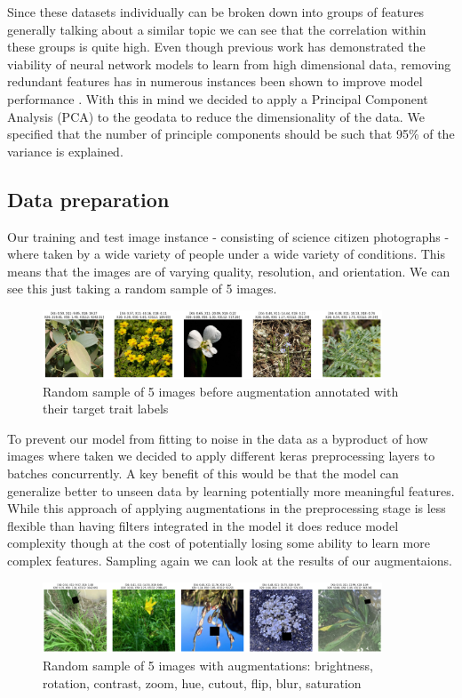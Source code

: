\documentclass[12pt,a4paper,oneside]{article}
\begin{document}
Since these datasets individually can be broken down into groups of features generally talking about a similar topic we can see that the correlation within these groups is quite high. Even though previous work \cite{DBLP:journals/corr/abs-2007-00062} has demonstrated the viability of neural network models to learn from high dimensional data, removing redundant features has in numerous instances been shown to improve model performance \cite{chen2022survey}. With this in mind we decided to apply a Principal Component Analysis (PCA) to the geodata to reduce the dimensionality of the data. We specified that the number of principle components should be such that 95\% of the variance is explained.   

\subsection{Data preparation}

Our training and test image instance - consisting of science citizen photographs - where taken by a wide variety of people under a wide variety of conditions. This means that the images are of varying quality, resolution, and orientation. We can see this just taking a random sample of 5 images.
\begin{figure}[!h]
    \centering
    \includegraphics[width=0.9\textwidth]{assets/before_aug_img.png}
    \caption{Random sample of 5 images before augmentation annotated with their target trait labels}
\end{figure}

To prevent our model from fitting to noise in the data as a byproduct of how images where taken we decided to apply different keras preprocessing layers to batches concurrently. A key benefit of this would be that the model can generalize better to unseen data by learning potentially more meaningful features. While this approach of applying augmentations in the preprocessing stage is less flexible than having filters integrated in the model it does reduce model complexity though at the cost of potentially losing some ability to learn more complex features. Sampling again we can look at the results of our augmentaions. 

\begin{figure}[!h]
    \centering
    \includegraphics[width=0.9\textwidth]{assets/after_aug_img.png}
    \caption{Random sample of 5 images with augmentations: brightness, rotation, contrast, zoom, hue, cutout, flip, blur, saturation}
\end{figure}
\end{document}
